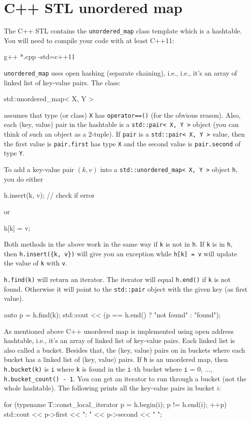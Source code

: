 \newpage
\section{C++ STL unordered map}

The C++ STL contains the \verb!unordered_map! class template
which is a hashtable.
You will need to compile your code with at least C++11:
\begin{console}
g++ *.cpp -std=c++11
\end{console}
\verb!unordered_map! uses open hashing (separate chaining), i.e., 
i.e., it's an array of linked list of key-value pairs.
The class:
\begin{console}
std::unordered_map< X, Y >
\end{console}
assumes that type (or class) \verb!X! has
\verb!operator==()!
(for the obvious reason).
Also, each (key, value) pair in the hashtable
is a \verb!std::pair< X, Y >! object
(you can think of such an object as a 2-tuple).
If \verb!pair! is a
\verb!std::pair< X, Y >! value,
then the first value is \verb!pair.first! has type \verb!X!
and the second value is \verb!pair.second! of type \verb!Y!.

To add a key-value pair $(k,v)$ into a
\verb!std::unordered_map< X, Y >! object \verb!h!, you do either
\begin{console}
h.insert({k, v}); // check if error
\end{console}
or
\begin{console}
h[k] = v;
\end{console}
Both methods in the above work in the same way if \verb!k! is not in \verb!h!.
If \verb!k! is in \verb!h!, then
\verb!h.insert({k, v})! will give you an exception
while
\verb!h[k] = v! will update the value of \verb!k! with \verb!v!.

\verb!h.find(k)! will return an iterator.
The iterator will equal \verb!h.end()! if \verb!k! is not found.
Otherwise it will point to the
\verb!std::pair! object with the given key (as first value).
\begin{console}
auto p = h.find(k);
std::cout << (p == h.end() ? "not found\n" : "found\n");  
\end{console}

As mentioned above C++ unordered map is implemented using open address hashtable,
i.e., it's an array of linked list of key-value pairs.
Each linked list is also called a bucket.
Besides that, the (key, value) pairs on in buckets
where each bucket has a linked list of (key, value) pairs.
If \verb!h! is an unordered map,
then \verb!h.bucket(k)! is \verb!i! where
\verb!k! is found in the \verb!i!--th bucket
where \verb!i! = 0, ..., \verb!h.bucket_count() - 1!.
You can get an iterator to run through a bucket (not the whole hashtable).
The following prints all the key-value pairs in bucket $i$:
\begin{console}
for (typename T::const_local_iterator p = h.begin(i);
     p != h.end(i); ++p)
{
    std::cout << p->first << ": " << p->second << "  ";
}
\end{console}

